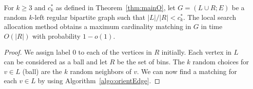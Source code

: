 \begin{corollary}
For $k\ge 3$ and $c^*_{k}$ as defined in Theorem~\ref{thm:mainO}, let $G=(L\cup R;E)$ be a random $k$-left regular bipartite graph such that ${|L| / |R| }<c^*_{k}$.  The local search allocation method obtains a maximum cardinality matching in $G$ in time $O(|R|)$ with probability $1-o(1)$.
\end{corollary}
\begin{proof}
We assign label $0$ to each of the vertices in $R$ initially. Each vertex in $L$ can be considered as a ball and let $R$ be the set of bins. The $k$ random choices for $v\in L$ (ball) are the $k$ random neighbors of $v$. We can now find a matching for each $v\in L$ by using Algorithm~\ref{algo:orientEdge}.
\end{proof}





